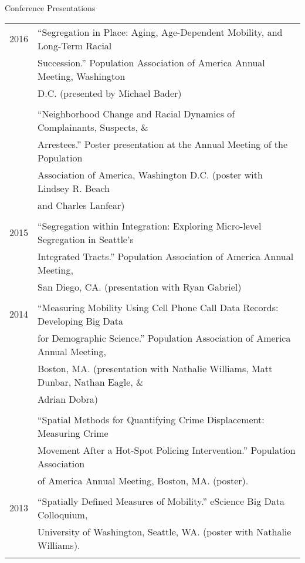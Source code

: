 \documentclass{resume} %
\begin{document}
\begin{rSection}{Conference Presentations}
\begin{tabular}{ @{} >{}l @{\hspace{6ex}} l }
2016	& ``Segregation in Place: Aging, Age-Dependent Mobility, and Long-Term Racial\\
		& Succession.'' Population Association of America Annual Meeting, Washington\\
		& D.C. (presented by Michael Bader)\\\\

		& ``Neighborhood Change and Racial Dynamics of Complainants, Suspects, \&\\
		& Arrestees.'' Poster presentation at the Annual Meeting of the Population\\
		& Association of America, Washington D.C. (poster with Lindsey R. Beach\\
		& and Charles Lanfear)\\\\

2015 	& ``Segregation within Integration: Exploring Micro-level Segregation in Seattle’s\\
		& Integrated Tracts.'' Population Association of America Annual Meeting, \\
		& San Diego, CA. (presentation with Ryan Gabriel)\\\\

2014 	& ``Measuring Mobility Using Cell Phone Call Data Records: Developing Big Data\\
		& for Demographic Science.'' Population Association of America Annual Meeting,\\
		& Boston, MA. (presentation with Nathalie Williams, Matt Dunbar, Nathan Eagle, \&\\
		& Adrian Dobra)\\\\

		& ``Spatial Methods for Quantifying Crime Displacement: Measuring Crime\\
		& Movement After a Hot-Spot Policing Intervention.'' Population Association\\
		& of America Annual Meeting, Boston, MA. (poster).\\\\

2013 	& ``Spatially Defined Measures of Mobility.'' eScience Big Data Colloquium,\\
		& University of Washington, Seattle, WA. (poster with Nathalie Williams).\\\\


\end{tabular}
\end{rSection}
\end{document}
